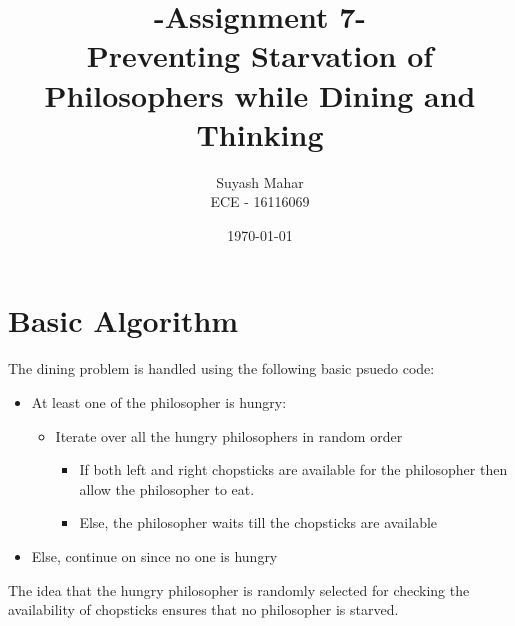 \documentclass[a4,11pt]{article}
\title{-Assignment 7-\\Preventing Starvation of Philosophers while
  Dining and Thinking}
\author{Suyash Mahar \\
  ECE - 16116069 }
\date{\today}
\begin{document}
\maketitle

\section{Basic Algorithm}
The dining problem is handled using the following basic psuedo code:

\begin{itemize}
\item At least one of the philosopher is hungry:
  \begin{itemize}
  \item Iterate over all the hungry philosophers in random order
    \begin{itemize}
    \item If both left and right chopsticks are available for the
      philosopher then allow the philosopher to eat.
    \item Else, the philosopher waits till the chopsticks are
      available
    \end{itemize}
  \end{itemize}
\item Else, continue on since no one is hungry
\end{itemize}

The idea that the hungry philosopher is randomly selected for checking
the availability of chopsticks ensures that no philosopher is starved.
\end{document}
